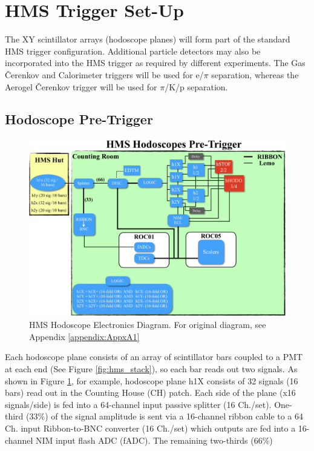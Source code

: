 \documentclass[11pt]{article}
\begin{document}
\section{HMS Trigger Set-Up} 
\indent The XY scintillator arrays (hodoscope planes) will form part of the standard HMS trigger configuration.  
Additional particle detectors may also be incorporated into the HMS trigger as required by different experiments. The Gas \v{C}erenkov and Calorimeter triggers will be
used for e/$\pi$ separation, whereas the Aerogel \v{C}erenkov trigger will be used for $\pi$/K/p separation. 


\subsection{Hodoscope Pre-Trigger}
\begin{figure}[h!]
  \centering
  \includegraphics[scale=0.5]{hHODO_diagram.png}
  \caption{HMS Hodoscope Electronics Diagram. For original diagram, see Appendix \ref{appendix:AppxA1}}
  \label{fig:hHODO_diagram}
\end{figure}
\noindent Each hodoscope plane consists of an array of scintillator bars coupled to a PMT at each end (See Figure \ref{fig:hms_stack}), so each bar reads out two signals. As shown in Figure \ref{fig:hHODO_diagram},
for example, hodoscope plane h1X consists of 32 signals (16 bars) read out in the Counting House (CH) patch. Each side of the plane (x16 signals/side) is fed into a 64-channel input passive splitter (16 Ch./set).
One-third (33\%) of the signal amplitude is sent via a 16-channel ribbon cable to a 64 Ch. input Ribbon-to-BNC converter (16 Ch./set) which outputs are fed into a 16-channel NIM input flash ADC (fADC). The remaining two-thirds (66\%)
\end{document}
